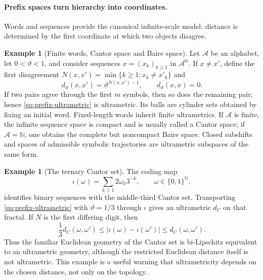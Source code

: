 \documentclass[11pt,a4paper]{article}
\theoremstyle{definition}
\newtheorem{example}[theorem]{Example}
\theoremstyle{remark}
\newcommand{\abs}[1]{\left\lvert #1\right\rvert}
\begin{document}
\paragraph{Prefix spaces turn hierarchy into coordinates.}
Words and sequences provide the canonical infinite-scale model: distance is
determined by the first coordinate at which two objects disagree.

\begin{example}[Finite words, Cantor space and Baire space]
\label{ex:prefix-ultrametric}
Let \(\mathcal A\) be an alphabet, let \(0<\vartheta<1\), and consider
sequences \(x=(x_k)_{k\geq1}\) in \(\mathcal A^{\mathbb N}\).  If
\(x\neq x'\), define the first disagreement
\(N(x,x')=\min\{k\geq1:x_k\neq x'_k\}\) and
\begin{equation}
  d_\vartheta(x,x')=\vartheta^{N(x,x')-1},
  \qquad d_\vartheta(x,x)=0.
  \label{eq:prefix-ultrametric}
\end{equation}
If two pairs agree through the first \(m\) symbols, then so does the remaining
pair; hence \eqref{eq:prefix-ultrametric} is ultrametric.  Its balls are
cylinder sets obtained by fixing an initial word.  Fixed-length words inherit
finite ultrametrics.  If \(\mathcal A\) is finite, the infinite sequence
space is compact and is usually called a Cantor space; if
\(\mathcal A=\mathbb N\), one obtains the complete but noncompact Baire
space.  Closed subshifts and spaces of admissible symbolic trajectories are
ultrametric subspaces of the same form.
\end{example}

\begin{example}[The ternary Cantor set]
\label{ex:cantor-set-ultrametric}
The coding map
\[
  \iota(\omega)=\sum_{k\geq1}2\omega_k3^{-k},
  \qquad \omega\in\{0,1\}^{\mathbb N},
\]
identifies binary sequences with the middle-third Cantor set.  Transporting
\eqref{eq:prefix-ultrametric} with \(\vartheta=1/3\) through \(\iota\) gives
an ultrametric \(d_C\) on that fractal.  If \(N\) is the first differing
digit, then
\begin{equation}
  \frac13 d_C(\omega,\omega')
  \leq \abs{\iota(\omega)-\iota(\omega')}
  \leq d_C(\omega,\omega').
  \label{eq:cantor-euclidean-comparison}
\end{equation}
Thus the familiar Euclidean geometry of the Cantor set is bi-Lipschitz
equivalent to an ultrametric geometry, although the restricted Euclidean
distance itself is not ultrametric.  This example is a useful warning that
ultrametricity depends on the chosen distance, not only on the topology.
\end{example}
\end{document}
